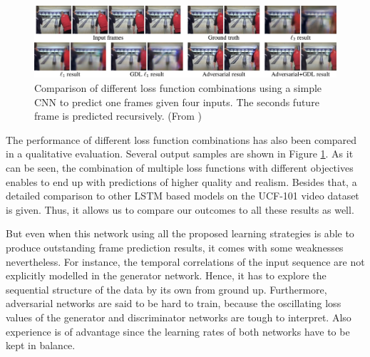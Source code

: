 \begin{figure}[htb]
	\centering
	\includegraphics[width=1.0\linewidth]{figures/related/deep_multiscale_samples.png} 
	\caption[Comparion of Loss Functions in GAN Model]{Comparison of different loss function combinations using a simple CNN to predict one frames given four inputs. The seconds future frame is predicted recursively. (From \parencite{deep_multiscale_video_pred})} \label{fig:gan_samples}
\end{figure}

The performance of different loss function combinations has also been compared in a qualitative evaluation. Several output samples are shown in Figure \ref{fig:gan_samples}. As it can be seen, the combination of multiple loss functions with different objectives enables to end up with predictions of higher quality and realism. Besides that, a detailed comparison to other LSTM based models on the UCF-101 video dataset is given. Thus, it allows us to compare our outcomes to all these results as well.

But even when this network using all the proposed learning strategies is able to produce outstanding frame prediction results, it comes with some weaknesses nevertheless. For instance, the temporal correlations of the input sequence are not explicitly modelled in the generator network. Hence, it has to explore the sequential structure of the data by its own from ground up. Furthermore, adversarial networks are said to be hard to train, because the oscillating loss values of the generator and discriminator networks are tough to interpret. Also experience is of advantage since the learning rates of both networks have to be kept in balance.
